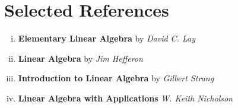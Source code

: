 \documentclass[10pt, aspectratio=169]{beamer}
\begin{document}
    


\section*{Selected References}
\begin{frame}[allowframebreaks]
\printbibliography
\begin{enumerate}[(i)]
    \item \textbf{Elementary Linear Algebra} by \textit{David C. Lay}
    \item \textbf{Linear Algebra} by \textit{Jim Hefferon}
    \item \textbf{Introduction to Linear Algebra} by \textit{Gilbert Strang}
    \item \textbf{Linear Algebra with Applications} \textit{W. Keith Nicholson}
\end{enumerate}
\end{frame}
\end{document}
